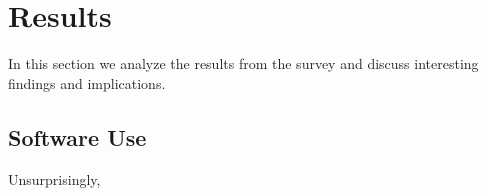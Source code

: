 \section{Results}

In this section we analyze the results from the survey and discuss interesting findings and implications.

\subsection{Software Use}
Unsurprisingly, 